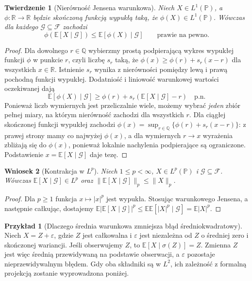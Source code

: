 \documentclass[11pt,a4paper,oneside]{report}
\numberwithin{equation}{chapter}
\theoremstyle{plain}
\newtheorem{twierdzenie}{Twierdzenie}[chapter]
\newtheorem{wniosek}[twierdzenie]{Wniosek}
\theoremstyle{definition}
\newtheorem{przyklad}{Przykład}[chapter]
\theoremstyle{remark}
\newcommand{\R}{\mathbb{R}}
\newcommand{\Prob}{\mathbb{P}}
\newcommand{\E}{\mathbb{E}}
\begin{document}
\begin{twierdzenie}[Nierówność Jensena warunkowa]
Niech $X\in L^1(\Prob)$, a $\phi:\R\to\R$ będzie
skończoną funkcją wypukłą taką, że
$\phi(X)\in L^1(\Prob)$. Wówczas dla każdego
$\mathcal G\subseteq\mathcal F$
zachodzi
\[
\phi(\E[X\mid\mathcal G])
\leq\E[\phi(X)\mid\mathcal G]
\qquad\text{prawie na pewno}.
\]
\end{twierdzenie}
\begin{proof}
Dla dowolnego $r\in\mathbb Q$ wybierzmy prostą
podpierającą wykres wypukłej funkcji $\phi$ w punkcie
$r$, czyli liczbę $s_r$ taką, że
$\phi(x)\geq\phi(r)+s_r(x-r)$ dla wszystkich $x\in\R$.
Istnienie $s_r$ wynika z nierówności pomiędzy
lewą i prawą pochodną funkcji wypukłej.
Dodatniość i liniowość warunkowej wartości
oczekiwanej dają
\[
\E[\phi(X)\mid\mathcal G]
\geq\phi(r)+s_r(\E[X\mid\mathcal G]-r)
\quad\text{p.n.}
\]
Ponieważ liczb wymiernych jest przeliczalnie wiele,
możemy wybrać \emph{jeden} zbiór pełnej miary,
na którym nierówność zachodzi dla wszystkich $r$.
Dla ciągłej skończonej funkcji wypukłej zachodzi
$\phi(x)=\sup_{r\in\mathbb Q}\{\phi(r)+s_r(x-r)\}$:
z prawej strony mamy co najwyżej $\phi(x)$,
a dla wymiernych $r\to x$ wyrażenia zbliżają się
do $\phi(x)$, ponieważ lokalnie nachylenia
podpierające są ograniczone. Podstawienie
$x=\E[X\mid\mathcal G]$ daje tezę.
\end{proof}

\begin{wniosek}[Kontrakcja w $L^p$]
Niech $1\leq p<\infty$, $X\in L^p(\Prob)$ i
$\mathcal G\subseteq\mathcal F$. Wówczas
$\E[X\mid\mathcal G]\in L^p$ oraz
$\|\E[X\mid\mathcal G]\|_p\leq\|X\|_p$.
\end{wniosek}
\begin{proof}
Dla $p\geq1$ funkcja $x\mapsto|x|^p$ jest wypukła.
Stosując warunkowego Jensena, a następnie całkując,
dostajemy
$\E|\E[X\mid\mathcal G]|^p\leq
\E\E[|X|^p\mid\mathcal G]=\E|X|^p$.
\end{proof}

\begin{przyklad}[Dlaczego średnia warunkowa zmniejsza błąd średniokwadratowy]
Niech $X=Z+\varepsilon$, gdzie $Z$ jest całkowalna
i $\varepsilon$ jest niezależna od $Z$ o średniej
zero i skończonej wariancji. Jeśli obserwujemy $Z$,
to $\E[X\mid\sigma(Z)]=Z$. Zmienna $Z$ jest więc
średnią przewidywaną na podstawie obserwacji, a
$\varepsilon$ pozostaje nieprzewidywalnym błędem.
Gdy oba składniki są w $L^2$, ich zależność
z formalną projekcją zostanie wyprowadzona poniżej.
\end{przyklad}
\end{document}
